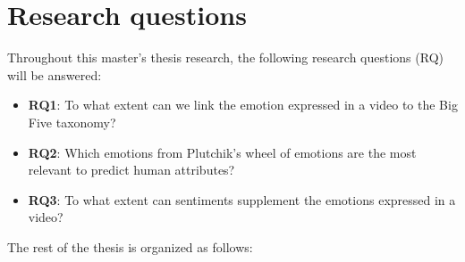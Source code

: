 \section{Research questions}
Throughout this master's thesis research, the following research questions (RQ) will be answered:
%
\begin{itemize}
    \item[] \textbf{RQ1}: To what extent can we link the emotion expressed in a video to the Big Five taxonomy?
    \item[] \textbf{RQ2}: Which emotions from Plutchik's wheel of emotions are the most relevant to predict human attributes?
    \item[] \textbf{RQ3}: To what extent can sentiments supplement the emotions expressed in a video?
\end{itemize}
%
The rest of the thesis is organized as follows:

